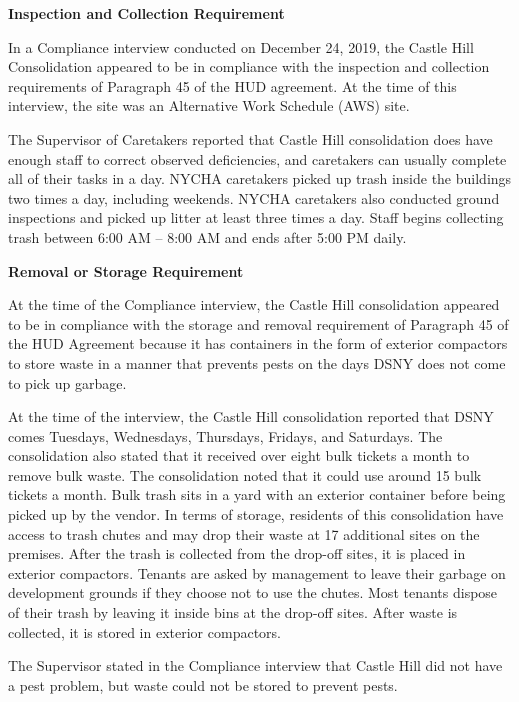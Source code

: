 

\textbf{Inspection and Collection Requirement} 

 

In a Compliance interview conducted on December 24, 2019, the Castle Hill Consolidation appeared to be in compliance with the inspection and collection requirements of Paragraph 45 of the HUD agreement. At the time of this interview, the site was an Alternative Work Schedule (AWS) site.

 

The Supervisor of Caretakers reported that Castle Hill consolidation does have enough staff to correct observed deficiencies, and caretakers  can usually complete all of their tasks in a day. NYCHA caretakers picked up trash inside the buildings two times a day, including weekends. NYCHA caretakers also conducted ground inspections and picked up litter at least three times a day. Staff begins collecting trash between 6:00 AM -- 8:00 AM and ends after 5:00 PM daily.

\textbf{Removal or Storage Requirement} 

 

At the time of the Compliance interview, the Castle Hill consolidation appeared to be in compliance with the storage and removal requirement of Paragraph 45 of the HUD Agreement because it has containers in the form of exterior compactors to store waste in a manner that prevents pests on the days DSNY does not come to pick up garbage. 

  

At the time of the interview, the Castle Hill consolidation reported that DSNY comes Tuesdays, Wednesdays, Thursdays, Fridays, and Saturdays. The consolidation also stated that it received over eight bulk tickets a month to remove bulk waste. The consolidation noted that it could use around 15 bulk tickets a month. Bulk trash sits in a yard with an exterior container before being picked up by the vendor. In terms of storage, residents of this consolidation have access to trash chutes and may drop their waste at 17 additional sites on the premises. After the trash is collected from the drop-off sites, it is placed in exterior compactors. Tenants are asked by management to leave their garbage on development grounds if they choose not to use the chutes. Most tenants dispose of their trash by leaving it inside bins at the drop-off sites. After waste is collected, it is stored in exterior compactors. 

 

The Supervisor stated in the Compliance interview that Castle Hill did not have a pest problem, but waste could not be stored to prevent pests.

